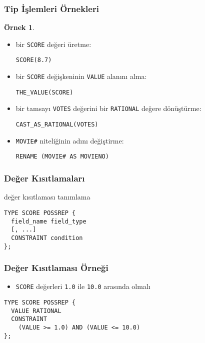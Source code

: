 \documentclass[dvipsnames]{beamer}
\theoremstyle{definition}
\theoremstyle{example}
\newtheorem{ornek}[theorem]{Örnek}
\theoremstyle{plain}
\begin{document}
\begin{frame}[fragile]
  \frametitle{Tip İşlemleri Örnekleri}

  \begin{ornek}
    \begin{itemize}
      \item bir \texttt{SCORE} değeri üretme:
      \begin{lstlisting}
SCORE(8.7)
      \end{lstlisting}

      \pause
      \item bir \texttt{SCORE} değişkeninin \texttt{VALUE} alanını alma:
      \begin{lstlisting}
THE_VALUE(SCORE)
      \end{lstlisting}

      \pause
      \item bir tamsayı \texttt{VOTES} değerini bir \texttt{RATIONAL} değere
        dönüştürme:
      \begin{lstlisting}
CAST_AS_RATIONAL(VOTES)
      \end{lstlisting}

      \pause
      \item \texttt{MOVIE\#} niteliğinin adını değiştirme:
      \begin{lstlisting}
RENAME (MOVIE# AS MOVIENO)
      \end{lstlisting}
    \end{itemize}
  \end{ornek}
\end{frame}

\begin{frame}[fragile]
  \frametitle{Değer Kısıtlamaları}

  \begin{block}{değer kısıtlaması tanımlama}
    \begin{lstlisting}
TYPE SCORE POSSREP {
  field_name field_type
  [, ...]
  CONSTRAINT condition
};
    \end{lstlisting}
  \end{block}
\end{frame}

\begin{frame}[fragile]
  \frametitle{Değer Kısıtlaması Örneği}

  \begin{example}
    \begin{itemize}
      \item \texttt{SCORE} değerleri \texttt{1.0} ile \texttt{10.0} arasında
        olmalı
    \end{itemize}

    \begin{lstlisting}
TYPE SCORE POSSREP {
  VALUE RATIONAL
  CONSTRAINT
    (VALUE >= 1.0) AND (VALUE <= 10.0)
};
    \end{lstlisting}
  \end{example}
\end{frame}
\end{document}
